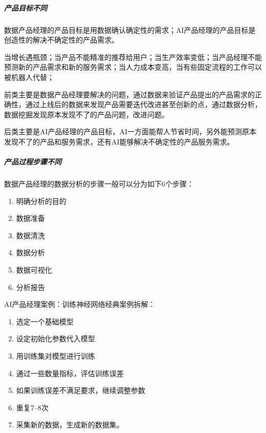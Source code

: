 \documentclass[letterpaper,11pt,english]{sphinxmanual}
\begin{document}
\subparagraph{产品目标不同}
\label{\detokenize{chapter_introduction/AI_PM:id18}}
数据产品经理的产品目标是用数据确认确定性的需求；AI产品经理的产品目标是创造性的解决不确定性的产品需求。

当增长遇瓶颈；当产品不能精准的推荐给用户；当生产效率变低；当产品经理不能预测新的产品需求和新的服务需求；当人力成本变高，当有些固定流程的工作可以被机器人代替；

前类主要是数据产品经理要解决的问题，通过数据来验证产品提出的产品需求的正确性，通过上线后的数据来发现产品需要迭代改进甚至创新的点，通过数据分析，数据挖掘发现原本发现不了的产品问题，改进问题。

后类主要是AI产品经理的产品目标，AI一方面能帮人节省时间，另外能预测原本发现不了的产品和服务需求，还有AI能够解决不确定性的产品服务需求。


\subparagraph{产品过程步骤不同}
\label{\detokenize{chapter_introduction/AI_PM:id19}}
数据产品经理的数据分析的步骤一般可以分为如下6个步骤：
\begin{enumerate}
%
\item {} 
明确分析的目的

\item {} 
数据准备

\item {} 
数据清洗

\item {} 
数据分析

\item {} 
数据可视化

\item {} 
分析报告

\end{enumerate}

AI产品经理案例：训练神经网络经典案例拆解：
\begin{enumerate}
%
\item {} 
选定一个基础模型

\item {} 
设定初始化参数代入模型

\item {} 
用训练集对模型进行训练

\item {} 
通过一些数量指标，评估训练误差

\item {} 
如果训练误差不满足要求，继续调整参数

\item {} 
重复7–8次

\item {} 
采集新的数据，生成新的数据集。

\end{enumerate}
\end{document}
